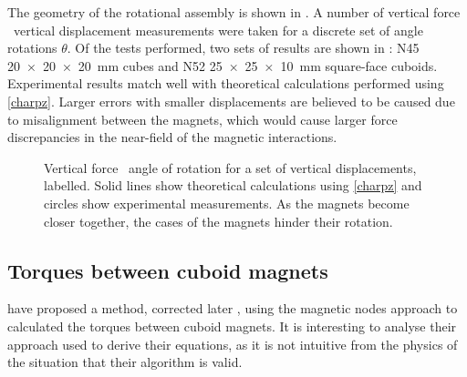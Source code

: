 \documentclass[11pt,a4paper]{memoir}
\begin{document}
The geometry of the rotational assembly is shown in .
A number of vertical force \vs\ vertical displacement measurements were taken for a discrete set of angle rotations $\theta$.
Of the tests performed, two sets of results are shown in : N45 \SI{20x20x20}{mm} cubes and N52 \SI{25x25x10}{mm} square-face cuboids.
Experimental results match well with theoretical calculations performed using \eqref{charpz}.
Larger errors with smaller displacements are believed to be caused due to misalignment between the magnets, which would cause larger force discrepancies in the near-field of the magnetic interactions.

\begin{figure}
  \begin{wide}
  \hfil
  \end{wide}
  \caption{
    Vertical force \vs\ angle of rotation for a set of vertical displacements, labelled.
    Solid lines show theoretical calculations using \eqref{charpz} and circles show experimental measurements.
    As the magnets become closer together, the cases of the magnets hinder their rotation.
  }
\end{figure}

\subsection{Torques between cuboid magnets}

\textcite{allag2009-ietm} have proposed a method, corrected later \cite{yonnet2011-ietm}, using the magnetic nodes approach to calculated the torques between cuboid magnets.
It is interesting to analyse their approach used to derive their equations, as it is not intuitive from the physics of the situation that their algorithm is valid.
\end{document}
